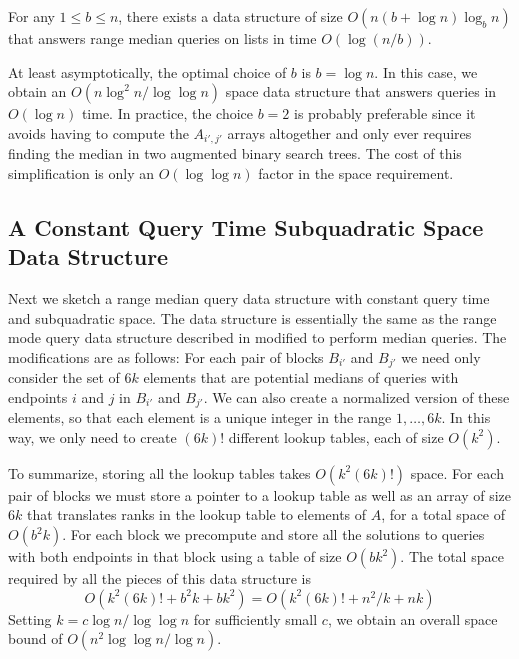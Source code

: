 \documentclass{njcarticle}
\begin{document}
\begin{theorem}
For any $1\le b\le n$, there exists a data structure of size
$O(n(b+\log n)\log_b n)$
that answers range median queries on lists in time $O(\log (n/b))$.
\end{theorem}

At least asymptotically, the optimal choice of $b$ is $b=\log n$. In
this case, we obtain an $O(n\log^2 n/\log\log n)$ space data structure
that answers queries in $O(\log n)$ time.  In practice, the choice
$b=2$ is probably preferable since it avoids having to compute the
$A_{i',j'}$ arrays altogether and only ever requires finding the
median in two augmented binary search trees.   The cost of this
simplification is only an $O(\log\log n)$ factor in the space
requirement.

\subsection{A Constant Query Time Subquadratic Space Data Structure}

Next we sketch a range median query data structure with constant query
time and subquadratic space.  The data structure is essentially the
same as the range mode query data structure described in
 modified to perform median queries.  The
modifications are as follows:  For each pair of blocks $B_{i'}$ and
$B_{j'}$ we need only consider the set of $6k$ elements that are
potential medians of queries with endpoints $i$ and $j$ in $B_{i'}$
and $B_{j'}$.  We can also create a normalized version of these
elements, so that each element is a unique integer in the range
$1,\ldots,6k$.  In this way, we only need to create $(6k)!$ different
lookup tables, each of size $O(k^2)$.

To summarize, storing all the lookup tables takes $O(k^2(6k)!)$ space.
For each pair of blocks we must store a pointer to a lookup table as
well as an array of size $6k$ that translates ranks in the lookup
table to elements of $A$, for a total space of $O(b^2k)$.  For each
block we precompute and store all the solutions to queries with both
endpoints in that block using a table of size $O(bk^2)$.  The total
space required by all the pieces of this data structure is 
\[
  O(k^2(6k)! + b^2k + bk^2) = O(k^2(6k)!+n^2/k+nk)
\]
Setting $k=c\log n/\log\log n$ for sufficiently small $c$, we obtain
an overall space bound of $O(n^2\log\log n/\log n)$.
\end{document}
